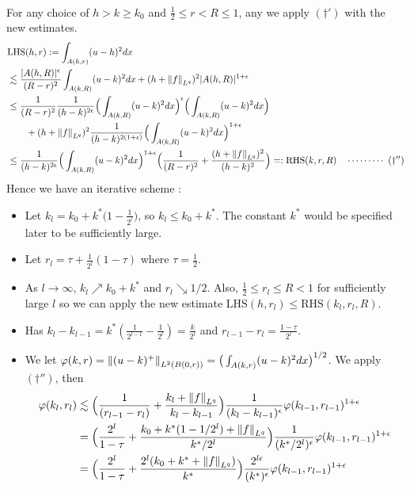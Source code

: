 \documentclass[12pt,a4paper]{article}
\newenvironment{proof}
{\begin{changemargin}{0.5cm}{0.5cm} 
	}%
	{\end{changemargin}
}
\newenvironment{p}
{\begin{proof} 
	}%
	{\end{proof}
}
\begin{document}
\begin{p}
\begin{align*}
\end{align*}
For any choice of $h> k \geq k_0$ and $\frac{1}{2} \leq r < R \leq 1$, any we apply $(\dagger')$ with the new estimates.
\begin{align*}
&\text{LHS}(h,r) := \int_{A(h,r)} (u-h)^2 dx \\
&\lesssim \frac{|A(h,R)|^{\epsilon}}{(R-r)^2} \int_{A(k,R)} (u-k)^2 dx + (h + \snorms{f}{L^q})^2 |A(h,R)|^{1+ \epsilon} \\
&\leq \frac{1}{(R-r)^2} \frac{1}{(h-k)^{2\epsilon}}\Big( \int_{A(k,R) } (u-k)^2 dx \Big)^{\epsilon} \Big( \int_{A(k,R)} (u-k)^2 dx \Big) \\
& \quad \quad + (h + \snorms{f}{L^q})^2 \frac{1}{(h-k)^{2(1+\epsilon)}} \Big( \int_{A(k,R)} (u-k)^2 dx \Big)^{1+\epsilon} \\
& \leq \frac{1}{(h-k)^{2\epsilon}} \Big( \int_{A(k,R)} (u-k)^2 dx \Big)^{1+\epsilon} \Big( \frac{1}{(R-r)^2} + \frac{(h+ \snorms{f}{L^q})^2}{(h-k)^2} \Big) =: \text{RHS}(k,r,R) \call{\dagger''}
\end{align*}
Hence we have an iterative scheme :
\begin{itemize}
\item Let $k_l = k_0 + k^* \big(1- \frac{1}{2^l}\big)$, so $k_l \leq k_0 + k^*$. The constant $k^*$ would be specified later to be sufficiently large.
\item Let $r_l = \tau + \frac{1}{2^l}(1-\tau)$ where $\tau = \frac{1}{2}$.
\item As $l\rightarrow \infty$, $k_l \nearrow k_0 + k^*$ and $r_l \searrow 1/2$. Also, $\frac{1}{2} \leq r_l \leq R < 1$ for sufficiently large $l$ so we can apply the new estimate $\text{LHS}(h,r_l) \leq \text{RHS}(k_l,r_l,R)$.
\item Has $k_l - k_{l-1} = k^* (\frac{1}{2^{l-1}} - \frac{1}{2^l}) = \frac{k}{2^l}$ and $r_{l-1} - r_l = \frac{1-\tau}{2^l}$.
\item We let $\varphi(k,r) = \snorms{(u-k)^+}{L^2(B(0,r))} = \big( \int_{A(k,r)}(u-k)^2 dx \big)^{1/2}$. We apply $(\dagger'')$, then
\begin{align*}
\varphi(k_l, r_l) &\lesssim \Big( \frac{1}{(r_{l-1} - r_l)} + \frac{k_l + \snorms{f}{L^q}}{k_l - k_{l-1}} \Big) \frac{1}{(k_l - k_{l-1})^{\epsilon}} \varphi(k_{l-1}, r_{l-1})^{1+\epsilon} \\
&= \Big( \frac{2^l}{1-\tau} + \frac{k_0 + k^* (1- 1/2^l) + \snorms{f}{L^q}}{k^* / 2^l} \Big) \frac{1}{(k^*/2^l)^{\epsilon}} \varphi(k_{l-1}, r_{l-1})^{1+\epsilon} \\
&= \Big(\frac{2^l}{1- \tau} + \frac{2^l (k_0 + k^* + \snorms{f}{L^q})}{k^*}\Big) \frac{2^{l\epsilon}}{(k^*)^{\epsilon}} \varphi(k_{l-1} , r_{l-1})^{1+\epsilon} \\

\end{align*}
\end{itemize}
\end{p}
\end{document}
